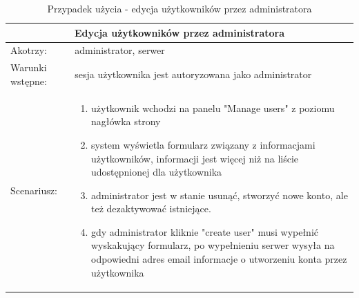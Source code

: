 \begin{table}[h!]
	\begin{tabular}{|p{2cm}||p{13cm}|}
		\hline
		\multicolumn{2}{|c|}{ Edycja użytkowników przez administratora} \\
		\hline
		Akotrzy: & administrator, serwer \\
		\hline
		Warunki wstępne: & sesja użytkownika jest autoryzowana jako administrator \\
		\hline
		Scenariusz: &
		\begin{enumerate}
			\item użytkownik wchodzi na panelu "Manage users" z poziomu nagłówka strony
			\item system wyświetla formularz związany z informacjami użytkowników, informacji jest więcej niż na liście udostępnionej dla użytkownika
			\item administrator jest w stanie usunąć, stworzyć nowe konto, ale też dezaktywować istniejące.
			\item gdy administrator kliknie "create user" musi wypełnić wyskakujący formularz, po wypełnieniu serwer wysyła na odpowiedni adres email informacje o utworzeniu konta przez użytkownika
		\end{enumerate}\\
		\hline
	\end{tabular}
	\caption{Przypadek użycia - edycja użytkowników przez  administratora}
\end{table}
